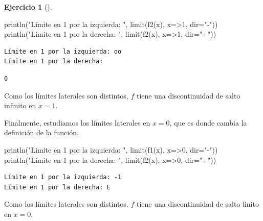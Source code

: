\documentclass[
  a4paper,
]{scrreport}
\newenvironment{Shaded}{\begin{snugshade}}{\end{snugshade}}
\newcommand{\FloatTok}[1]{\textcolor[rgb]{0.68,0.00,0.00}{#1}}
\newcommand{\FunctionTok}[1]{\textcolor[rgb]{0.28,0.35,0.67}{#1}}
\newcommand{\NormalTok}[1]{\textcolor[rgb]{0.00,0.23,0.31}{#1}}
\newcommand{\OperatorTok}[1]{\textcolor[rgb]{0.37,0.37,0.37}{#1}}
\newcommand{\StringTok}[1]{\textcolor[rgb]{0.13,0.47,0.30}{#1}}
\theoremstyle{definition}
\newtheorem{exercise}{Ejercicio}[chapter]
\theoremstyle{remark}
\begin{document}
\begin{exercise}[]
\begin{tcolorbox}
\begin{Shaded}
\begin{Highlighting}[]
\FunctionTok{println}\NormalTok{(}\StringTok{"Límite en 1 por la izquierda: "}\NormalTok{, }\FunctionTok{limit}\NormalTok{(}\FunctionTok{f2}\NormalTok{(x), x}\OperatorTok{=\textgreater{}}\FloatTok{1}\NormalTok{, dir}\OperatorTok{=}\StringTok{"{-}"}\NormalTok{))}
\FunctionTok{println}\NormalTok{(}\StringTok{"Límite en 1 por la derecha: "}\NormalTok{, }\FunctionTok{limit}\NormalTok{(}\FunctionTok{f2}\NormalTok{(x), x}\OperatorTok{=\textgreater{}}\FloatTok{1}\NormalTok{, dir}\OperatorTok{=}\StringTok{"+"}\NormalTok{))}
\end{Highlighting}
\end{Shaded}

\begin{verbatim}
Límite en 1 por la izquierda: oo
Límite en 1 por la derecha: 
\end{verbatim}

\begin{verbatim}
0
\end{verbatim}

Como los límites laterales son distintos, \(f\) tiene una discontinuidad
de salto infinito en \(x=1\).

Finalmente, estudiamos los límites laterales en \(x=0\), que es donde
cambia la definición de la función.

\begin{Shaded}
\begin{Highlighting}[]
\FunctionTok{println}\NormalTok{(}\StringTok{"Límite en 1 por la izquierda: "}\NormalTok{, }\FunctionTok{limit}\NormalTok{(}\FunctionTok{f1}\NormalTok{(x), x}\OperatorTok{=\textgreater{}}\FloatTok{0}\NormalTok{, dir}\OperatorTok{=}\StringTok{"{-}"}\NormalTok{))}
\FunctionTok{println}\NormalTok{(}\StringTok{"Límite en 1 por la derecha: "}\NormalTok{, }\FunctionTok{limit}\NormalTok{(}\FunctionTok{f2}\NormalTok{(x), x}\OperatorTok{=\textgreater{}}\FloatTok{0}\NormalTok{, dir}\OperatorTok{=}\StringTok{"+"}\NormalTok{))}
\end{Highlighting}
\end{Shaded}

\begin{verbatim}
Límite en 1 por la izquierda: -1
Límite en 1 por la derecha: E
\end{verbatim}

Como los límites laterales son distintos, \(f\) tiene una discontinuidad
de salto finito en \(x=0\).

\end{tcolorbox}

\end{exercise}
\end{document}
